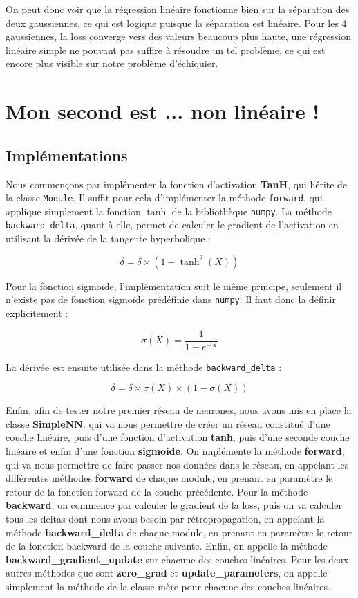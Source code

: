 \documentclass{article}
\begin{document}
On peut donc voir que la régression linéaire fonctionne bien sur la séparation des deux gaussiennes, ce qui est logique puisque la séparation est linéaire. Pour les 4 gaussiennes, la loss converge vers des valeurs beaucoup plus haute, une régression linéaire simple ne pouvant pas suffire à résoudre un tel problème, ce qui est encore plus visible sur notre problème d'échiquier.

\section{Mon second est ... non linéaire !}
\subsection{Implémentations}
Nous commençons par implémenter la fonction d’activation \textbf{TanH}, qui hérite de la classe \texttt{Module}. Il suffit pour cela d’implémenter la méthode \texttt{forward}, qui applique simplement la fonction $\tanh$ de la bibliothèque \texttt{numpy}. La méthode \texttt{backward\_delta}, quant à elle, permet de calculer le gradient de l’activation en utilisant la dérivée de la tangente hyperbolique :

\[
\delta = \delta \times \left(1 - \tanh^2(X)\right)
\]

Pour la fonction sigmoïde, l’implémentation suit le même principe, seulement il n’existe pas de fonction sigmoïde prédéfinie dans \texttt{numpy}. Il faut donc la définir explicitement :

\[
\sigma(X) = \frac{1}{1 + e^{-X}}
\]

La dérivée est ensuite utilisée dans la méthode \texttt{backward\_delta} :

\[
\delta = \delta \times \sigma(X) \times \left(1 - \sigma(X)\right)
\]



Enfin, afin de tester notre premier réseau de neurones, nous avons mis en place la classe \textbf{SimpleNN}, qui va nous permettre de créer un réseau constitué d'une couche linéaire, puis d'une fonction d'activation \textbf{tanh}, puis d'une seconde couche linéaire et enfin d'une fonction \textbf{sigmoide}. On implémente la méthode \textbf{forward}, qui va nous permettre de faire passer nos données dans le réseau, en appelant les différentes méthodes \textbf{forward} de chaque module, en prenant en paramètre le retour de la fonction forward de la couche précédente. Pour la méthode \textbf{backward}, on commence par calculer le gradient de la loss, puis on va calculer tous les deltas dont nous avons besoin par rétropropagation, en appelant la méthode \textbf{backward\_delta} de chaque module, en prenant en paramètre le retour de la fonction backward de la couche suivante. Enfin, on appelle la méthode \textbf{backward\_gradient\_update} sur chacune des couches linéaires. Pour les deux autres méthodes que sont \textbf{zero\_grad} et \textbf{update\_parameters}, on appelle simplement la méthode de la classe mère pour chacune des couches linéaires.
\end{document}
